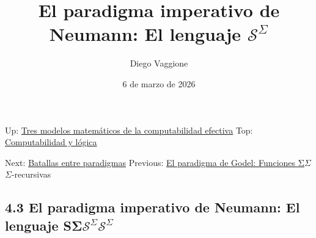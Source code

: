 \documentclass[
]{article}
\title{El paradigma imperativo de Neumann: El lenguaje $\mathcal{S}^{\Sigma}$}
\author{Diego Vaggione \and 6 de marzo de 2026}
\date{}
\begin{document}
\maketitle
\setcounter{section}{3}

\hypertarget{MathJax_Message}{}

{ {Up:}
\href{https://granlogico.com/apunteweb/4-tres-modelos-matem\%C3\%A1ticos-de-la-computabilidad-efectiva.html}{Tres
modelos matemáticos de la computabilidad efectiva} } { {Top:}
\href{https://granlogico.com/apunteweb/index.html}{Computabilidad y
lógica} }

{ {Next:}
\href{https://granlogico.com/apunteweb/4.4-batallas-entre-paradigmas.html}{Batallas
entre paradigmas} } { {Previous:}
\href{https://granlogico.com/apunteweb/4.2-el-paradigma-de-godel-funciones-sigma-recursivas.html}{El
paradigma de Godel: Funciones
{{}\protect\hypertarget{MathJax-Element-1-Frame}{}{\protect\hypertarget{MJXc-Node-1}{}{\protect\hypertarget{MJXc-Node-2}{}{\protect\hypertarget{MJXc-Node-3}{}{{Σ}}}}{\(\Sigma\)}}}}}\(\Sigma\)-recursivas

\hypertarget{el-paradigma-imperativo-de-neumann-el-lenguaje-mathcalssigma}{%
\subsection[{4.3} El paradigma imperativo de Neumann: El lenguaje
\(\mathcal{S}^{\Sigma}\)]{\texorpdfstring{{4.3} El paradigma imperativo
de Neumann: El lenguaje
{{}\protect\hypertarget{MathJax-Element-2-Frame}{}{\protect\hypertarget{MJXc-Node-4}{}{\protect\hypertarget{MJXc-Node-5}{}{\protect\hypertarget{MJXc-Node-6}{}{{\protect\hypertarget{MJXc-Node-7}{}{\protect\hypertarget{MJXc-Node-8}{}{\protect\hypertarget{MJXc-Node-9}{}{{S}}}}}{\protect\hypertarget{MJXc-Node-10}{}{\protect\hypertarget{MJXc-Node-11}{}{\protect\hypertarget{MJXc-Node-12}{}{{Σ}}}}}}}}{\(\mathcal{S}^{\Sigma}\)}}}\(\mathcal{S}^{\Sigma}\)}{4.3 El paradigma imperativo de Neumann: El lenguaje SΣ\textbackslash mathcal\{S\}\^{}\{\textbackslash Sigma\}\textbackslash mathcal\{S\}\^{}\{\textbackslash Sigma\}}}\label{el-paradigma-imperativo-de-neumann-el-lenguaje-mathcalssigma}}
\end{document}
